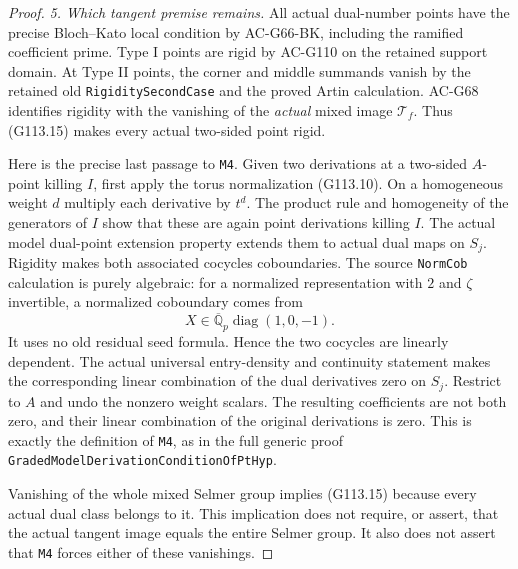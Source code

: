 \begin{proof}
\emph{5. Which tangent premise remains.}
All actual dual-number points have the precise Bloch--Kato local
condition by AC-G66-BK, including the ramified coefficient prime.
Type I points are rigid by AC-G110 on the retained support domain.
At Type II points, the corner and middle summands vanish by the
retained old \texttt{RigiditySecondCase} and the proved Artin
calculation.  AC-G68 identifies rigidity with the vanishing of
the \emph{actual} mixed image \(\mathcal T_f\).  Thus (G113.15)
makes every actual two-sided point rigid.

Here is the precise last passage to \texttt{M4}.  Given two
derivations at a two-sided \(A\)-point killing \(I\), first
apply the torus normalization (G113.10).  On a homogeneous
weight \(d\) multiply each derivative by \(t^d\).  The product
rule and homogeneity of the generators of \(I\) show that these
are again point derivations killing \(I\).  The actual model
dual-point extension property extends them to actual dual maps
on \(S_j\).  Rigidity makes both associated cocycles coboundaries.
The source \texttt{NormCob} calculation is purely algebraic:
for a normalized representation with \(2\) and \(\zeta\)
invertible, a normalized coboundary comes from
\[
                         X\in\overline{\mathbb Q}_p
                                       \operatorname{diag}(1,0,-1).
 \tag{G113.19}
\]
It uses no old residual seed formula.  Hence the two cocycles
are linearly dependent.  The actual universal entry-density and
continuity statement makes the corresponding linear combination
of the dual derivatives zero on \(S_j\).  Restrict to \(A\)
and undo the nonzero weight scalars.  The resulting coefficients
are not both zero, and their linear combination of the original
derivations is zero.  This is exactly the definition of
\texttt{M4}, as in the full generic proof
\texttt{GradedModelDerivationConditionOfPtHyp}.

Vanishing of the whole mixed Selmer group implies (G113.15)
because every actual dual class belongs to it.  This implication
does not require, or assert, that the actual tangent image equals
the entire Selmer group.  It also does not assert that \texttt{M4}
forces either of these vanishings.
\end{proof}

